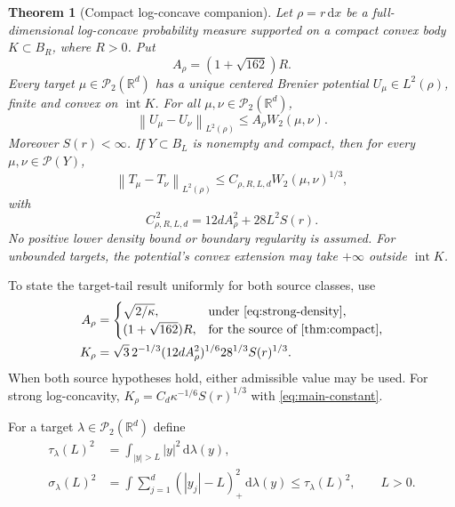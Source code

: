 \documentclass[11pt]{article}
\numberwithin{equation}{section}
\newtheorem{theorem}{Theorem}[section]
\theoremstyle{remark}
\newcommand{\R}{\mathbb R}
\newcommand{\Prob}{\mathcal P}
\newcommand{\dd}{\,\mathrm d}
\newcommand{\interior}{\operatorname{int}}
\newcommand{\norm}[1]{\left\lVert #1\right\rVert}
\begin{document}
\begin{theorem}[Compact log-concave companion]\label{thm:compact}
Let $\rho=r\dd x$ be a full-dimensional log-concave probability measure supported on a compact convex body $K\subset B_R$, where $R>0$. Put
\[
 A_\rho=(1+\sqrt{162})R.
\]
Every target $\mu\in\Prob_2(\R^d)$ has a unique centered Brenier potential $U_\mu\in L^2(\rho)$, finite and convex on $\interior K$. For all $\mu,\nu\in\Prob_2(\R^d)$,
\begin{equation}\label{eq:compact-potential}
 \norm{U_\mu-U_\nu}_{L^2(\rho)}
 \le A_\rho W_2(\mu,\nu).
\end{equation}
Moreover $S(r)<\infty$. If $Y\subset B_L$ is nonempty and compact, then for every $\mu,\nu\in\Prob(Y)$,
\begin{equation}\label{eq:compact-map}
 \norm{T_\mu-T_\nu}_{L^2(\rho)}
 \le C_{\rho,R,L,d}W_2(\mu,\nu)^{1/3},
\end{equation}
with
\[
 C_{\rho,R,L,d}^{\,2}
 =12dA_\rho^2+28L^2S(r).
\]
No positive lower density bound or boundary regularity is assumed. For unbounded targets, the potential's convex extension may take $+\infty$ outside $\interior K$.
\end{theorem}

To state the target-tail result uniformly for both source classes, use
\begin{equation}\label{eq:A-and-K}
 \begin{split}
 A_\rho&=\begin{cases}
 \sqrt{2/\kappa},&\text{under \eqref{eq:strong-density}},\\
 (1+\sqrt{162})R,&\text{for the source of \Cref{thm:compact}},
 \end{cases}\\
 K_\rho&=\sqrt3\,2^{-1/3}(12dA_\rho^2)^{1/6}28^{1/3}S(r)^{1/3}.
 \end{split}
\end{equation}
When both source hypotheses hold, either admissible value may be used. For strong log-concavity, $K_\rho=C_d\kappa^{-1/6}S(r)^{1/3}$ with \eqref{eq:main-constant}.

For a target $\lambda\in\Prob_2(\R^d)$ define
\begin{equation}\label{eq:target-tails}
 \begin{split}
 \tau_\lambda(L)^2&=\int_{|y|>L}|y|^2\dd\lambda(y),\\
 \sigma_\lambda(L)^2&=\int\sum_{j=1}^d(|y_j|-L)_+^2\dd\lambda(y)
 \le\tau_\lambda(L)^2,\qquad L>0.
 \end{split}
\end{equation}
\end{document}
